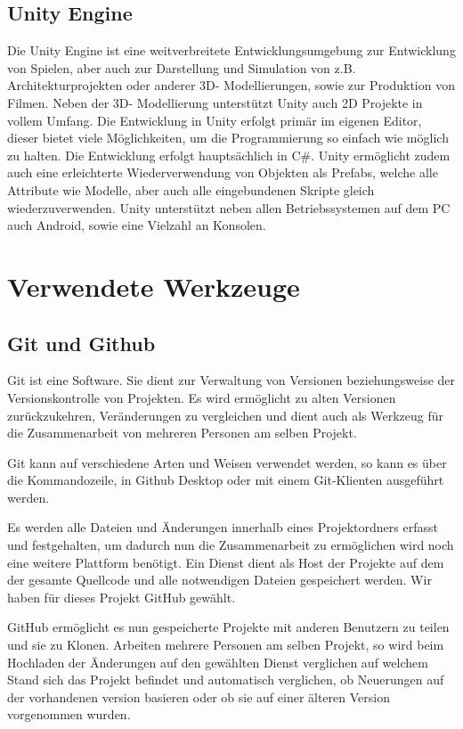 \documentclass[
	12pt, %
	a4paper,
	listof=totoc, %
	bibliography=totoc, %
	numbers=noenddot, %
	ngerman, %
	headsepline, %
	oneside %
	]{scrbook} %
\begin{document}
\section{Unity Engine}
Die Unity Engine ist eine weitverbreitete Entwicklungsumgebung zur Entwicklung von Spielen, aber auch zur Darstellung und Simulation von z.B. Architekturprojekten oder anderer 3D- Modellierungen, sowie zur Produktion von Filmen. Neben der 3D- Modellierung unterstützt Unity auch 2D Projekte in vollem Umfang. Die Entwicklung in Unity erfolgt primär im eigenen Editor, dieser bietet viele Möglichkeiten, um die Programmierung so einfach wie möglich zu halten. Die Entwicklung erfolgt hauptsächlich in C\#. Unity ermöglicht zudem auch eine erleichterte Wiederverwendung von Objekten als \glqq Prefabs\grqq , welche alle Attribute wie Modelle, aber auch alle eingebundenen Skripte gleich wiederzuverwenden. Unity unterstützt neben allen Betriebssystemen auf dem PC auch Android, sowie eine Vielzahl an Konsolen. 

\chapter{Verwendete Werkzeuge}
\section{Git und Github}
Git ist eine Software. Sie dient zur Verwaltung von Versionen beziehungsweise der Versionskontrolle von Projekten. Es wird ermöglicht zu alten Versionen zurückzukehren, Veränderungen zu vergleichen und dient auch als Werkzeug für die Zusammenarbeit von mehreren Personen am selben Projekt.  

Git kann auf verschiedene Arten und Weisen verwendet werden, so kann es über die Kommandozeile, in Github Desktop oder mit einem Git-Klienten ausgeführt werden.

Es werden alle Dateien und Änderungen innerhalb eines Projektordners erfasst und festgehalten, um dadurch nun die Zusammenarbeit zu ermöglichen wird noch eine weitere Plattform benötigt.  
Ein Dienst dient als Host der Projekte auf dem der gesamte Quellcode und alle notwendigen Dateien gespeichert werden. Wir haben für dieses Projekt GitHub gewählt.

GitHub ermöglicht es nun gespeicherte Projekte mit anderen Benutzern zu teilen und sie zu Klonen. Arbeiten mehrere Personen am selben Projekt, so wird beim Hochladen der Änderungen auf den gewählten Dienst verglichen auf welchem Stand sich das Projekt befindet und automatisch verglichen, ob Neuerungen auf der vorhandenen version basieren oder ob sie auf einer älteren Version vorgenommen wurden.  
\end{document}
